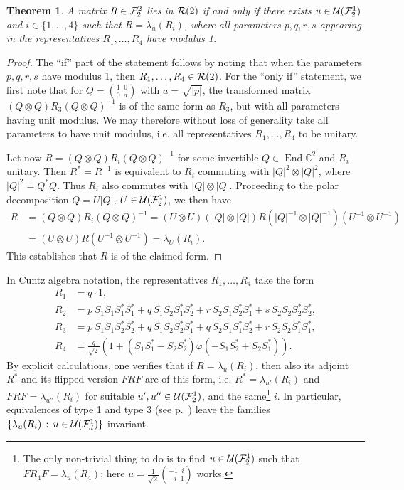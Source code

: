 \documentclass[12pt,a4paper]{amsart}
\numberwithin{equation}{section}
\newtheorem{theorem}{Theorem}[section]
\theoremstyle{remark}
\def\End{\operatorname{End}}
\newcommand{\ot}{\otimes}
\def\C{\mathbb{C}}
\newcommand{\la}{\lambda}
\newcommand{\CU}[0]{\mathcal{U}} \newcommand{\CV}[0]{\mathcal{V}}
\begin{document}
\begin{theorem}\label{thm:2dRmatrices}
	A matrix $R\in\mathcal{F}_2^2$ lies in $\mathcal{R}(2)$ if and only if there exists $u\in\CU(\CF_2^1)$ and $i\in\{1,\ldots,4\}$ such that $R=\la_u(R_i)$, where all parameters $p,q,r,s$ appearing in the representatives $R_1,\ldots,R_4$ have modulus 1.
\end{theorem}
\begin{proof}
	The ``if'' part of the statement follows by noting that when the parameters $p,q,r,s$ have modulus 1, then $R_1,\ldots,R_4\in\mathcal{R}(2)$. For the ``only if'' statement, we first note that for $Q=\genfrac{(}{)}{0pt}{1}{1\;\;0}{0\;\;a}$ with $a=\sqrt{|p|}$, the transformed matrix $(Q\ot Q)R_3(Q\ot Q)^{-1}$ is of the same form as $R_3$, but with all parameters having unit modulus. We may therefore without loss of generality take all parameters to have unit modulus, i.e. all representatives $R_1,\ldots,R_4$ to be unitary.
	
	Let now $R=(Q\ot Q)R_i(Q\ot Q)^{-1}$ for some invertible $Q\in\End\C^2$ and $R_i$ unitary. Then $R^*=R^{-1}$ is equivalent to $R_i$ commuting with $|Q|^2\ot |Q|^2$, where $|Q|^2=Q^*Q$. Thus $R_i$ also commutes with $|Q|\ot |Q|$. Proceeding to the polar decomposition $Q=U|Q|$, $U\in\CU(\CF_2^1)$, we then have
	\begin{align*}
		R&=(Q\ot Q)R_i(Q\ot Q)^{-1}
		=
		(U\ot U)(|Q|\ot|Q|)R(|Q|^{-1}\ot|Q|^{-1})(U^{-1}\ot U^{-1})
		\\
		&=
		(U\ot U)R(U^{-1}\ot U^{-1})
		=
		\la_U(R_i).
	\end{align*}
	This establishes that $R$ is of the claimed form.
\end{proof}

In Cuntz algebra notation, the representatives $R_1,\ldots,R_4$ take the form
\begin{align}
	R_1
	&=q\cdot 1,\\
	R_2
	&=
	p\,S_1S_1S_1^*S_1^*+
	q\,S_1S_2S_1^*S_2^*+
	r\,S_2S_1S_2^*S_1^*+		
	s\,S_2S_2S_2^*S_2^*,
	\\
	R_3
	&=
	p\,S_1S_1S_2^*S_2^*+
	q\,S_1S_2S_2^*S_1^*+
	q\,S_2S_1S_1^*S_2^*+		
	r\,S_2S_2S_1^*S_1^*,
	\\
	R_4
	&=
	\frac{q}{\sqrt{2}}\left(1+(S_1S_1^*-S_2S_2^*)\varphi(-S_1S_2^*+S_2S_1^*)\right)
	.
\end{align}
By explicit calculations, one verifies that if $R=\la_u(R_i)$, then also its adjoint~$R^*$ and its flipped version $FRF$ are of this form, i.e. $R^*=\la_{u'}(R_i)$ and $FRF=\la_{u''}(R_i)$ for suitable $u',u''\in\CU(\CF_2^1)$, and the same\footnote{The only non-trivial thing to do is to find $u\in\CU(\CF_2^1)$ such that $FR_4F=\la_u(R_4)$; here $u=\frac{1}{\sqrt{2}}\genfrac{(}{)}{0pt}{1}{-1\;\;i}{-i\;\;1}$ works.} $i$. In particular, equivalences of type 1 and type 3 (see p.~\pageref{page:types}) leave the families $\{\la_u(R_i)\,:\,u\in\CU(\CF_d^1)\}$ invariant.
\end{document}
